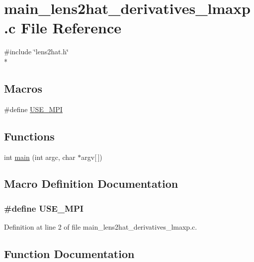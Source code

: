 \section{main\-\_\-lens2hat\-\_\-derivatives\-\_\-lmaxp.\-c File Reference}
\label{main__lens2hat__derivatives__lmaxp_8c}
{\ttfamily \#include \char`\"{}lens2hat.\-h\char`\"{}}\\*
\subsection*{Macros}
\begin{DoxyCompactItemize}
\item 
\#define \hyperlink{main__lens2hat__derivatives__lmaxp_8c_a3869d282031f6ea6b50fdb980b758420}{U\-S\-E\-\_\-\-M\-P\-I}
\end{DoxyCompactItemize}
\subsection*{Functions}
\begin{DoxyCompactItemize}
\item 
int \hyperlink{main__lens2hat__derivatives__lmaxp_8c_a0ddf1224851353fc92bfbff6f499fa97}{main} (int argc, char $\ast$argv\mbox{[}$\,$\mbox{]})
\end{DoxyCompactItemize}


\subsection{Macro Definition Documentation}
\subsubsection[{U\-S\-E\-\_\-\-M\-P\-I}]{\setlength{\rightskip}{0pt plus 5cm}\#define U\-S\-E\-\_\-\-M\-P\-I}\label{main__lens2hat__derivatives__lmaxp_8c_a3869d282031f6ea6b50fdb980b758420}


Definition at line 2 of file main\-\_\-lens2hat\-\_\-derivatives\-\_\-lmaxp.\-c.



\subsection{Function Documentation}
